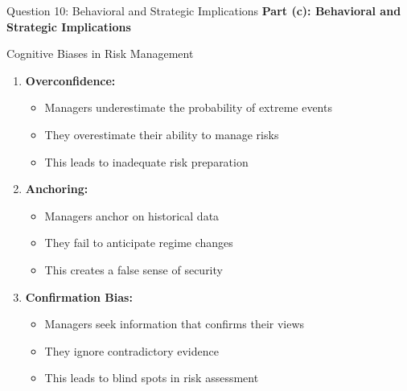 \documentclass[aspectratio=169]{beamer}
\newcommand{\question}[1]{{\large\bfseries\color{crimson}#1}}
\begin{document}
	\begin{frame}{Question 10: Behavioral and Strategic Implications}
		\question{Part (c): Behavioral and Strategic Implications}
		
		\begin{block}{Cognitive Biases in Risk Management}
			
			\begin{enumerate}
				\item \textbf{Overconfidence:}
				\begin{itemize}
					\item Managers underestimate the probability of extreme events
					\item They overestimate their ability to manage risks
					\item This leads to inadequate risk preparation
				\end{itemize}
				
				\item \textbf{Anchoring:}
				\begin{itemize}
					\item Managers anchor on historical data
					\item They fail to anticipate regime changes
					\item This creates a false sense of security
				\end{itemize}
				
				\item \textbf{Confirmation Bias:}
				\begin{itemize}
					\item Managers seek information that confirms their views
					\item They ignore contradictory evidence
					\item This leads to blind spots in risk assessment
				\end{itemize}
			\end{enumerate}
		\end{block}
	\end{frame}
	
\end{document}
